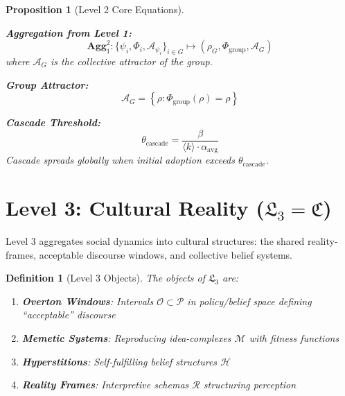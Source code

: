\documentclass[11pt,twoside]{book}
\newcommand{\Frac}{\Phi}
\newcommand{\Level}[1]{\mathfrak{L}_{#1}}
\newcommand{\Cultural}{\mathfrak{C}}
\newcommand{\PsychAttractor}{\mathcal{A}_\psi}
\newcommand{\GroupFrac}{\Phi_{\mathrm{group}}}
\newcommand{\Overton}{\mathcal{O}}
\newcommand{\Memetic}{\mathcal{M}}
\newcommand{\Hyperstition}{\mathcal{H}}
\newcommand{\Aggregate}[2]{\mathbf{Agg}_{#1}^{#2}}
\newtheorem{definition}{Definition}[chapter]
\newtheorem{proposition}{Proposition}[chapter]
\begin{document}
\begin{proposition}[Level 2 Core Equations]
\label{prop:L2-equations}

\textbf{Aggregation from Level 1:}
\begin{equation}
    \Aggregate{1}{2} : \{\psi_i, \Frac_i, \PsychAttractor_i\}_{i \in G} \mapsto
    (\rho_G, \GroupFrac, \mathcal{A}_G)
\end{equation}
where $\mathcal{A}_G$ is the collective attractor of the group.

\textbf{Group Attractor:}
\begin{equation}
    \mathcal{A}_G = \left\{ \rho : \GroupFrac(\rho) = \rho \right\}
\end{equation}

\textbf{Cascade Threshold:}
\begin{equation}
    \theta_{\mathrm{cascade}} = \frac{\beta}{\langle k \rangle \cdot \alpha_{\mathrm{avg}}}
\end{equation}
Cascade spreads globally when initial adoption exceeds $\theta_{\mathrm{cascade}}$.
\end{proposition}

\section{Level 3: Cultural Reality ($\Level{3} = \Cultural$)}

Level 3 aggregates social dynamics into cultural structures: the shared
reality-frames, acceptable discourse windows, and collective belief systems.

\begin{definition}[Level 3 Objects]
\label{def:L3-objects}
The objects of $\Level{3}$ are:
\begin{enumerate}[label=(\alph*)]
    \item \textbf{Overton Windows}: Intervals $\Overton \subset \mathcal{P}$ in
          policy/belief space defining ``acceptable'' discourse
    \item \textbf{Memetic Systems}: Reproducing idea-complexes $\Memetic$ with
          fitness functions
    \item \textbf{Hyperstitions}: Self-fulfilling belief structures $\Hyperstition$
    \item \textbf{Reality Frames}: Interpretive schemas $\mathcal{R}$ structuring perception
\end{enumerate}
\end{definition}
\end{document}
